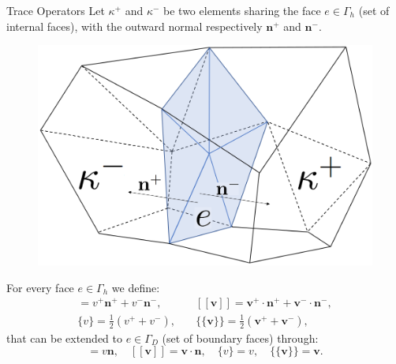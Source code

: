 \documentclass{beamer}
\begin{document}
\begin{frame}{Trace Operators}
	 Let $\kappa^+$ and $\kappa^-$ be two elements sharing the face
	 $e \in \Gamma_h$ (set of internal faces), with the outward normal
	 respectively $\mathbf{n}^+$ and
	 $\mathbf{n}^-$.\\
	\begin{figure}
		\centering
		\includegraphics[scale=0.12]{polinormali}
		\end{figure}
	For every face $e \in \Gamma_h$ we define:
	\begin{align*}
	[v] = v^+ \mathbf{n}^+ + v^- \mathbf{n}^-,
	&\quad [\![ \mathbf{v} ]\!] = \mathbf{v}^+ \cdot \mathbf{n}^+ +
	\mathbf{v}^- \cdot \mathbf{n}^-,\\
	\{v\} = \frac{1}{2} (v^+ + v^-) ,
	& \quad \{\!\!\{ \mathbf{v} \}\!\!\} = \frac{1}{2} (\mathbf{v}^+
	+\mathbf{v}^-),
	\end{align*}
	that can be extended to $e \in \Gamma_D$ (set of boundary faces) through:
	\begin{equation*}
	[v] = v \mathbf{n},
	\quad [\![ \mathbf{v} ]\!] = \mathbf{v} \cdot \mathbf{n},
	\quad \{v\} = v,
	\quad \{\!\!\{ \mathbf{v} \}\!\!\} = \mathbf{v}.
	\end{equation*}
\end{frame}
\end{document}
